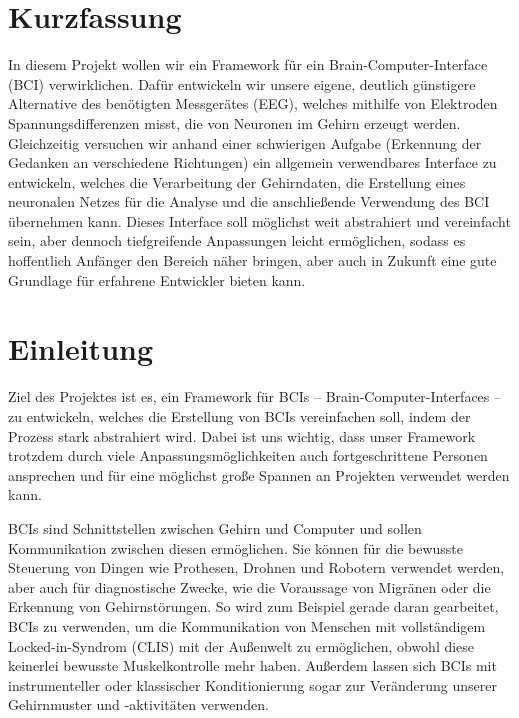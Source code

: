 \documentclass[10pt]{article}
\begin{document}
\section*{Kurzfassung}
In diesem Projekt wollen wir ein Framework für ein Brain-Computer-Interface (BCI) verwirklichen. Dafür entwickeln wir unsere eigene, deutlich günstigere Alternative des benötigten Messgerätes (EEG), welches mithilfe von Elektroden Spannungsdifferenzen misst, die von Neuronen im Gehirn erzeugt werden. Gleichzeitig versuchen wir anhand einer schwierigen Aufgabe (Erkennung der Gedanken an verschiedene Richtungen) ein allgemein verwendbares Interface zu entwickeln, welches die Verarbeitung der Gehirndaten, die Erstellung eines neuronalen Netzes für die Analyse und die anschließende Verwendung des BCI übernehmen kann. Dieses Interface soll möglichst weit abstrahiert und vereinfacht sein, aber dennoch tiefgreifende Anpassungen leicht ermöglichen, sodass es hoffentlich Anfänger den Bereich näher bringen, aber auch in Zukunft eine gute Grundlage für erfahrene Entwickler bieten kann.

\newpage


\section{Einleitung}
Ziel des Projektes ist es, ein Framework für BCIs -- Brain-Computer-Interfaces -- zu entwickeln, welches die Erstellung von BCIs vereinfachen soll, indem der Prozess stark abstrahiert wird.
Dabei ist uns wichtig, dass unser Framework trotzdem durch viele Anpassungsmöglichkeiten auch fortgeschrittene Personen ansprechen und für eine möglichst große Spannen an Projekten verwendet werden kann.

BCIs sind Schnittstellen zwischen Gehirn und Computer und sollen Kommunikation zwischen diesen ermöglichen.
Sie können für die bewusste Steuerung von Dingen wie Prothesen, Drohnen und Robotern verwendet werden, aber auch für diagnostische Zwecke, wie die Voraussage von Migränen oder die Erkennung von Gehirnstörungen.
So wird zum Beispiel gerade daran gearbeitet, BCIs zu verwenden, um die Kommunikation von Menschen mit vollständigem Locked-in-Syndrom (CLIS) mit der Außenwelt zu ermöglichen, obwohl diese keinerlei bewusste Muskelkontrolle mehr haben. \cite{BCIChaudhary}
Außerdem lassen sich BCIs mit instrumenteller oder klassischer Konditionierung sogar zur Veränderung unserer Gehirnmuster und -aktivitäten verwenden. \cite{BCIChaudhary}
\end{document}
